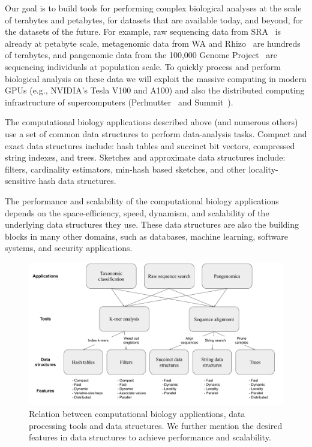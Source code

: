 
Our goal 
is to build tools for performing complex biological analyses at the scale of terabytes and petabytes, for datasets that are available today, and beyond, for the datasets of the future. For example, raw sequencing data from SRA~\cite{kodama2012sequence} is already at petabyte scale, metagenomic data from WA and Rhizo~\cite{hofmeyr2020terabase} are hundreds of terabytes, and pangenomic data from the 100,000 Genome Project~\cite{1002021100} are sequencing individuals at population scale. To quickly process and perform biological analysis on these data we will exploit the massive computing in modern GPUs (e.g., NVIDIA's Tesla V100 and A100) and also the distributed computing infrastructure of supercomputers (Perlmutter~\cite{perlmutter} and Summit~\cite{summit}).

The computational biology applications described above (and numerous others)  use a set of common data structures to perform data-analysis tasks.
Compact and exact data structures include: hash tables and succinct bit vectors, compressed string indexes, and trees.
Sketches and approximate data structures include: filters, cardinality estimators,  min-hash based sketches, and other locality-sensitive hash data structures.

The performance and scalability of the computational biology applications
depends on the space-efficiency, speed, dynamism, and scalability of the
underlying data structures they use. These data structures are also the building blocks in many other domains, such as databases, machine learning, software systems, and security applications.

\begin{figure}
\centering
\includegraphics[width=1.0\textwidth]{images/PPOSS_App_DS}
\caption{Relation between computational biology applications, data processing tools and data structures. We further mention the desired features in data structures to achieve performance and scalability.}
\label{fig1}
\end{figure}


